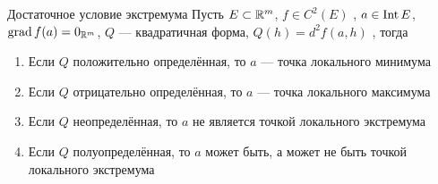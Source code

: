 \begin{teor}[https://www.youtube.com/live/oGN0SkfpZME?si=qexLykbHb05US92W&t=4191]{Достаточное условие экстремума}
	Пусть $E \subset \mathbb R^m$, $f \in C^2(E)$ , $a \in \mathrm{Int}\, E$, $\mathrm{grad\,} f(a) = 0_{\mathbb R^m}$, $Q$ --- квадратичная форма, $Q(h) = d^2f(a, h)$ \uns{\hypersetup{linkcolor=mygray}(\ref{опр:дифференциал})}, тогда 
	\begin{enumerate}
		\item Если $Q$ положительно определённая, то $a$ --- точка локального минимума 
		
		\item Если $Q$ отрицательно определённая, то $a$ --- точка локального максимума
		
		\item Если $Q$ неопределённая, то $a$ не является точкой локального экстремума
		
		\item Если $Q$ полуопределённая, то $a$ может быть, а может не быть точкой локального экстремума
	\end{enumerate}
\end{teor}

